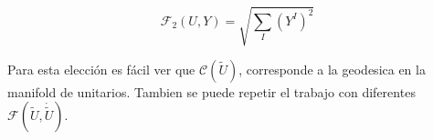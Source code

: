 \documentclass[../Main.tex]{subfiles}
\begin{document}
\begin{equation}
\mathcal{F}_2(U,Y)=\sqrt{\sum_{I} (Y^{I})^2}
\label{cost}
\end{equation}

Para esta elección es fácil ver que $\mathcal{C}(\tilde U)$, corresponde a la geodesica en la manifold de unitarios. Tambien se puede repetir el trabajo con diferentes $\mathcal{F}(\tilde U,\dot{\tilde U})$. 


\end{document}
